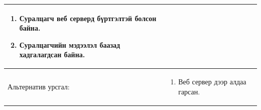 \begin{center}
\begin{table}[!htbp]
\begin{tabular}{|p{4cm}|p{11cm}|}
				 \begin{enumerate}
									\item Суралцагч веб серверд бүртгэлтэй болсон байна. 
									\item Суралцагчийн мэдээлэл баазад хадгалагдсан байна. 
				\end{enumerate}	   
\\				   \hline
				Альтернатив урсгал: &  \begin{enumerate}
									\item Веб сервер дээр алдаа гарсан. 
										\end{enumerate}
				\\	\hline
		\end{tabular}
	\end{table}
\end{center}



